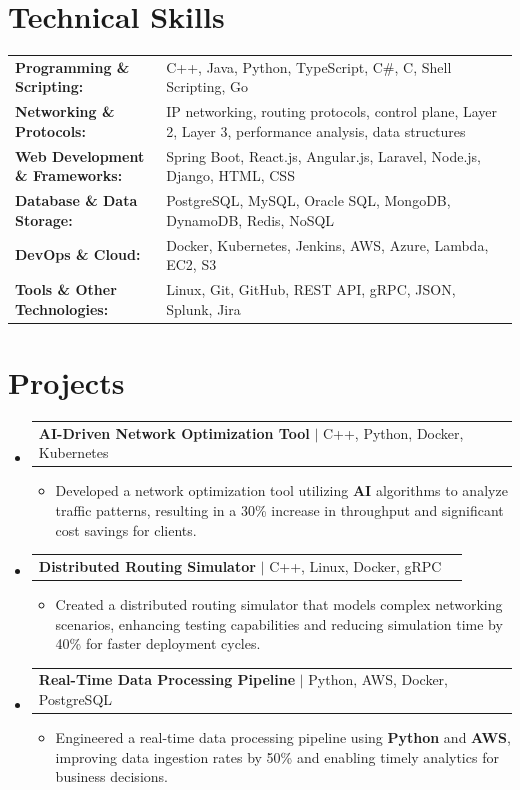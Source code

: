 \documentclass[letterpaper,10pt]{article}
\makeatletter
\newcommand{\resumeItem}[1]{
  \item{\fontsize{8pt}{9pt}\selectfont
    #1 \vspace{-3pt}
  }
}
\newcommand{\resumeProjectHeading}[2]{
    \item
    \begin{tabular*}{1.001\textwidth}{l@{\extracolsep{\fill}}r}
      \fontsize{8.5pt}{10pt}#1 & \textbf{\fontsize{8.5pt}{10pt} #2}\\
    \end{tabular*}\vspace{-7pt}
}
\newcommand{\resumeSubHeadingListStart}{\begin{itemize}[leftmargin=0pt, label={}]}
\newcommand{\resumeSubHeadingListEnd}{\end{itemize}}
\newcommand{\resumeItemListStart}{\begin{itemize}[leftmargin=*]}
\newcommand{\resumeItemListEnd}{\end{itemize}\vspace{-5pt}}
\makeatother
\begin{document}
\section{Technical Skills}
        \vspace{-14pt}
        \begin{table}[h]
            \fontsize{8pt}{9pt}\selectfont
            \begin{tabular}{p{0.3\linewidth} p{0.7\linewidth}}
                \textbf{Programming \& Scripting:} & C++, Java, Python, TypeScript, C\#, C, Shell Scripting, Go \\
                \textbf{Networking \& Protocols:} & IP networking, routing protocols, control plane, Layer 2, Layer 3, performance analysis, data structures \\
                \textbf{Web Development \& Frameworks:} & Spring Boot, React.js, Angular.js, Laravel, Node.js, Django, HTML, CSS \\
                \textbf{Database \& Data Storage:} & PostgreSQL, MySQL, Oracle SQL, MongoDB, DynamoDB, Redis, NoSQL \\
                \textbf{DevOps \& Cloud:} & Docker, Kubernetes, Jenkins, AWS, Azure, Lambda, EC2, S3 \\
                \textbf{Tools \& Other Technologies:} & Linux, Git, GitHub, REST API, gRPC, JSON, Splunk, Jira \\
            \end{tabular}
        \end{table}
 \vspace{-18pt}

\section{Projects}
    \vspace{-5pt}
    \resumeSubHeadingListStart
          \resumeProjectHeading
            {\textbf{AI-Driven Network Optimization Tool} $|$ C++, Python, Docker, Kubernetes}{}
            \resumeItemListStart
                \resumeItem{Developed a network optimization tool utilizing \textbf{AI} algorithms to analyze traffic patterns, resulting in a 30\% increase in throughput and significant cost savings for clients.}
            \resumeItemListEnd
        \vspace{-12pt}
    
        \resumeProjectHeading
            {\textbf{Distributed Routing Simulator} $|$ C++, Linux, Docker, gRPC}{}
        \resumeItemListStart
                \resumeItem{Created a distributed routing simulator that models complex networking scenarios, enhancing testing capabilities and reducing simulation time by 40\% for faster deployment cycles.}
        \resumeItemListEnd
      \vspace{-12pt}
      \resumeProjectHeading
        {\textbf{Real-Time Data Processing Pipeline} $|$ Python, AWS, Docker, PostgreSQL}{}
    \resumeItemListStart
            \resumeItem{Engineered a real-time data processing pipeline using \textbf{Python} and \textbf{AWS}, improving data ingestion rates by 50\% and enabling timely analytics for business decisions.}
    \resumeItemListEnd
    \resumeSubHeadingListEnd
\end{document}
